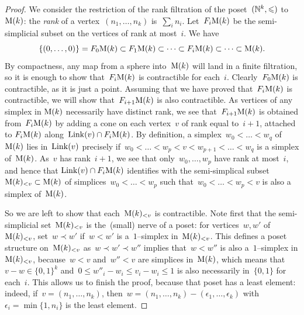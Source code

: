 \begin{proof}
We consider the restriction of the rank filtration of the poset~$(\mathbb{N}^k,\leqslant)$ to~$\mathrm{M}(k)$: the {\em rank} of a vertex~$(n_1,\dots,n_k)$ is~$\sum_in_i$. Let~$F_i\mathrm{M}(k)$ be the semi-simplicial subset on the vertices of rank at most~$i$.  We have 
$$\{(0,\dots,0)\}=F_0\mathrm{M}(k)\subset F_1\mathrm{M}(k)\subset \dots \subset F_i\mathrm{M}(k)\subset \dots\subset \mathrm{M}(k).$$
By compactness, any map from a sphere into~$\mathrm{M}(k)$ will land in a finite filtration, so it is enough to show that~$F_i\mathrm{M}(k)$ is contractible for each~$i$. Clearly~$F_0\mathrm{M}(k)$ is contractible, as it is just a point. Assuming that we have proved that~$F_i\mathrm{M}(k)$ is contractible, we will show that~$F_{i+1}\mathrm{M}(k)$ is also contractible. As vertices of any simplex in 
$\mathrm{M}(k)$ necessarily have distinct rank, we see that~$F_{i+1}\mathrm{M}(k)$ is obtained from~$F_i\mathrm{M}(k)$ by adding a cone on each vertex~$v$ of rank equal to~$i+1$, attached to 
$F_i\mathrm{M}(k)$ along~$\operatorname{Link}(v)\cap F_i\mathrm{M}(k)$. By definition, a simplex~$w_0<\dots<w_q$ of~$\mathrm{M}(k)$ lies in~$\operatorname{Link}(v)$ precisely if~$w_0<\dots<w_p<v<w_{p+1}<\dots<w_q$ is a simplex of~$\mathrm{M}(k)$. As~$v$ has rank~$i+1$, we see that only~$w_0,\dots,w_p$ have rank at most~$i$, and hence that 
$\operatorname{Link}(v)\cap F_i\mathrm{M}(k)$ identifies with the semi-simplical subset~$\mathrm{M}(k)_{<v}\subset \mathrm{M}(k)$ of simplices~$w_0<\dots<w_p$ such that~\hbox{$w_0<\dots<w_p<v$} is also a simplex of~$\mathrm{M}(k)$. 

So we are left to show that each~$\mathrm{M}(k)_{<v}$ is contractible. Note first that the semi-simplicial set~$\mathrm{M}(k)_{<v}$ is the~(small) nerve of a poset: for vertices~$w,w'$ of~$\mathrm{M}(k)_{<v}$, set~\hbox{$w\prec w'$} if~$w<w'$ is a~$1$--simplex in~$\mathrm{M}(k)_{<v}$. This defines a poset structure on~$\mathrm{M}(k)_{<v}$  as~$w\prec w'\prec w''$ implies that~$w<w''$ is also a~$1$--simplex in $\mathrm{M}(k)_{<v}$, because~$w<v$ and~$w''<v$ are simplices in~$\mathrm{M}(k)$, which means that~\hbox{$v-w\in \{0,1\}^k$} and~\hbox{$0\le w''_i-w_i\le v_i-w_i\le 1$} is also necessarily in~$\{0,1\}$ for each~$i$. 
This allows us to finish the proof, because that poset has a least element: indeed, if~$v=(n_1,\dots,n_k)$, then~\hbox{$w=(n_1,\dots,n_k)-(\epsilon_1,\dots,\epsilon_k)$} 
with $\epsilon_i=\min\{1,n_i\}$ 
is the least element.
\end{proof}


